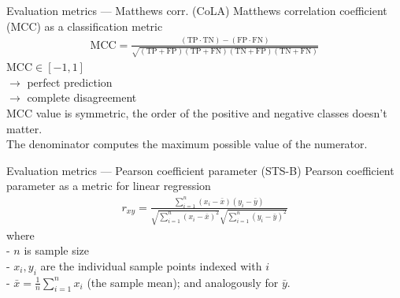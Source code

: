\documentclass[aspectratio=169,xcolor=dvipsnames]{beamer}
\begin{document}

\begin{frame}{Evaluation metrics --- Matthews corr. (CoLA)}
    Matthews correlation coefficient (MCC) as a classification metric
    \bigskip
    \begin{align*}
        \mathrm{MCC}=\frac{(\mathrm{TP} \cdot \mathrm{TN})-(\mathrm{FP} \cdot \mathrm{FN})}{\sqrt{(\mathrm{TP}+\mathrm{FP})(\mathrm{TP}+\mathrm{FN})(\mathrm{TN}+\mathrm{FP})(\mathrm{TN}+\mathrm{FN})}}
    \end{align*}
    $\text{MCC} \in [-1, 1]$\\
     $\rightarrow$ perfect prediction\\
     $\rightarrow$ complete disagreement\\
    \medskip
    MCC value is symmetric, the order of the positive and negative classes doesn't matter. \\
    \medskip
    The denominator computes the maximum possible value of the numerator.
\end{frame}


\begin{frame}{Evaluation metrics ---  Pearson coefficient parameter (STS-B)}
    Pearson coefficient parameter as a metric for linear regression
    \begin{align*}
        r_{x y}=\frac{\sum_{i=1}^n\left(x_i-\bar{x}\right)\left(y_i-\bar{y}\right)}{\sqrt{\sum_{i=1}^n\left(x_i-\bar{x}\right)^2} \sqrt{\sum_{i=1}^n\left(y_i-\bar{y}\right)^2}}
    \end{align*}
        where \\
        - $n$ is sample size \\
        - $x_i, y_i$ are the individual sample points indexed with $i$ \\
        - $\bar{x}=\frac{1}{n} \sum_{i=1}^n x_i$ (the sample mean); and analogously for $\bar{y}$.
\end{frame}

\end{document}

